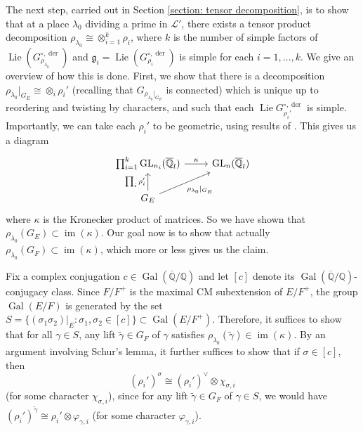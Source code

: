 \documentclass{amsart}
\theoremstyle{definition}
\numberwithin{equation}{section} %
\newcommand{\GL}{\operatorname{GL}}
\newcommand{\Lie}{\operatorname{Lie}}
\newcommand{\im}{\operatorname{im}}
\newcommand{\der}{\operatorname{der}}
\newcommand{\Gal}{\operatorname{Gal}}
\newcommand{\bb}[1]{\mathbb{#1}}
\newcommand{\mc}[1]{\mathcal{#1}}
\newcommand{\mf}[1]{\mathfrak{#1}}
\newcommand{\wt}[1]{\widetilde{#1}}
\newcommand{\ol}[1]{\overline{#1}}
\begin{document}
The next step, carried out in Section \ref{section: tensor decomposition}, is to show that at a place \( \lambda_0 \) dividing a prime in \( \mc{L}' \), there exists a tensor product decomposition \( \rho_{\lambda_0}\cong\otimes_{i=1}^k \rho_i \), where \( k \) is the number of simple factors of \( \Lie(G_{\rho_{\lambda_0}}^{\circ,\der}) \) and \( \mf{g}_i=\Lie(G_{\rho_i}^{\circ,\der}) \) is simple for each \( i=1,\dots,k \). We give an overview of how this is done. First, we show that there is a decomposition \( \rho_{\lambda_0}|_{G_{E}} \cong \otimes_i \rho_i' \) (recalling that \( G_{\rho_{\lambda_0}|_{G_E}} \) is connected) which is unique up to reordering and twisting by characters, and such that each \( \Lie G_{\rho_i'}^{\circ,\der} \) is simple. 
Importantly, we can take each $\rho_i'$ to be geometric, using results of \cite{patrikis2019variations}.
This gives us a diagram
\[ \begin{tikzcd}
    \prod_{i=1}^k \GL_{n_i}(\ol{\bb{Q}}_l)\ar{r}{\kappa} & \GL_n(\ol{\bb{Q}}_l) \\
    G_E\ar{u}{\prod_i\rho_i'}\ar[swap]{ru}{\rho_{\lambda_0}|_{G_E}} &
\end{tikzcd}
\]
where \( \kappa \) is the Kronecker product of matrices. So we have shown that \( \rho_{\lambda_0}(G_E) \subset \im(\kappa) \). Our goal now is to show that actually \( \rho_{\lambda_0}(G_F)\subset \im(\kappa) \), which more or less gives us the claim.

Fix a complex conjugation \( c\in\Gal(\ol{\bb{Q}}/\bb{Q}) \) and let \( [c] \) denote its \( \Gal(\ol{\bb{Q}}/\bb{Q}) \)-conjugacy class. Since \( F/F^+ \) is the maximal CM subextension of \( E/F^+ \), the group \( \Gal(E/F) \) is generated by the set \( S = \{ (\sigma_1\sigma_2)|_E:\sigma_1,\sigma_2\in [c] \}\subset \Gal(E/F^+) \). Therefore, it suffices to show that for all \( \gamma\in S \), any lift \( \wt{\gamma}\in G_F \) of \( \gamma \) satisfies \( \rho_{\lambda_0}(\wt{\gamma})\in \im(\kappa) \).  
By an argument involving Schur's lemma, it further suffices to show that if \( \sigma\in[c] \), then 
\begin{equation} \label{eqn: intro main technical result}
(\rho_i')^\sigma\cong (\rho_i')^\vee\otimes \chi_{\sigma,i}    
\end{equation}  
(for some character \( \chi_{\sigma,i} \)), since for any lift \( \wt{\gamma}\in G_F \) of \( \gamma\in S \), we would have \( (\rho_i')^{\wt{\gamma}}\cong \rho_i'\otimes \varphi_{\gamma,i} \) (for some character \( \varphi_{\gamma,i} \)).
\end{document}
